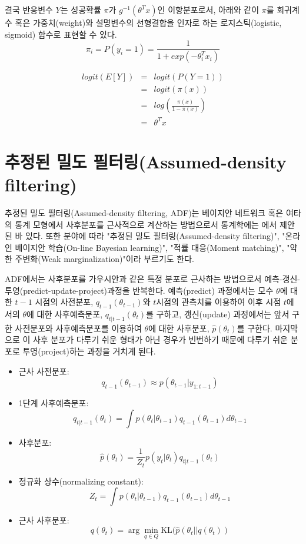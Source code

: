 \documentclass[oneside,b5paper,11pt]{book} %
\begin{document}
결국 반응변수 $Y$는 성공확률 $\pi$가 $g^{-1}(\theta^T x)$인 이항분포로서, 아래와 같이 $\pi$를 회귀계수 혹은 가중치(weight)와 설명변수의 선형결합을 인자로 하는 로지스틱(logistic, sigmoid) 함수로 표현할 수 있다.
$$
\pi_i = P(y_i=1) = \frac{1}{1+exp(-\theta_i^T x_i)}
$$

\begin{eqnarray}
    {}logit(E[Y])  
  &=& logit(P(Y=1))  \\
  &=& logit(\pi(x))  \\  
  &=& log \left( \frac{\pi(x)}{1-\pi(x)}\right) \\
  &=& \theta^T x
\end{eqnarray}


\section{추정된 밀도 필터링(Assumed-density filtering)}
 추정된 밀도 필터링(Assumed-density filtering, ADF)는 베이지안 네트워크 혹은 여타의 통계 모형에서 사후분포를 근사적으로 계산하는 방법으로서 통계학에는 \citet{Lauritzen1992}에서 제안된 바 있다. 또한 분야에 따라 "추정된 밀도 필터링(Assumed-density filtering)", "온라인 베이지안 학습(On-line Bayesian learning)", "적률 대응(Moment matching)", "약한 주변화(Weak marginalization)"이라 부르기도 한다. \citep{Minka2013}

 ADF에서는 사후분포를 가우시안과 같은 특정 분포로 근사하는 방법으로서 예측-갱신-투영(predict-update-project)과정을 반복한다. 예측(predict) 과정에서는 모수 $\theta$에 대한 $t-1$ 시점의 사전분포, $q_{t-1}(\theta_{t-1})$와 $t$시점의 관측치를 이용하여 이후 시점 $t$에서의 $\theta$에 대한 사후예측분포, $q_{t|t-1}(\theta_{t})$를 구하고, 갱신(update) 과정에서는 앞서 구한 사전분포와 사후예측분포를 이용하여 $\theta$에 대한 사후분포, $\hat{p}(\theta_t)$를 구한다. 마지막으로 이 사후 분포가 다루기 쉬운 형태가 아닌 경우가 빈번하기 때문에 다루기 쉬운 분포로 투영(project)하는 과정을 거치게 된다.

\begin{itemize}
\item 근사 사전분포: 
$$q_{t-1}(\theta_{t-1}) \approx p(\theta_{t-1}|y_{1:t-1})$$
\item 1단계 사후예측분포: 
$$q_{t|t-1}(\theta_t) = \int p(\theta_t | \theta_{t-1}) q_{t-1}(\theta_{t-1}) d\theta_{t-1}$$
\item 사후분포:
$$\hat{p}(\theta_t) = \frac{1}{Z_t}p(y_t | \theta_t)q_{t|t-1}(\theta_t)$$
\item 정규화 상수(normalizing constant):
$$Z_t = \int p(\theta_t | \theta_{t-1})q_{t-1}(\theta_{t-1})d\theta_{t-1}$$
\item 근사 사후분포:
$$q(\theta_t) = \arg\min_{q \in Q} \mathrm{KL}(\hat{p}(\theta_t || q(\theta_t)) $$
\end{itemize}
\end{document}
